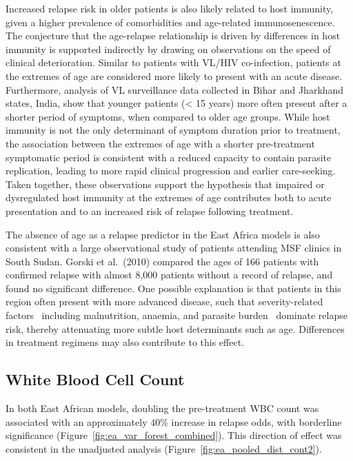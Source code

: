 Increased relapse risk in older patients is also likely related to host immunity, given a higher prevalence of comorbidities and age-related immunosenescence\cite{liu2023}. The conjecture that the age-relapse relationship is driven by differences in host immunity is supported indirectly by drawing on observations on the speed of clinical deterioration. Similar to patients with VL/HIV co-infection, patients at the extremes of age are considered more likely to present with an acute disease\cite{pareyn2025,farrar2023manson}. Furthermore, analysis of VL surveillance data collected in Bihar and Jharkhand states, India, show that younger patients (< 15 years) more often present after a shorter period of symptoms, when compared to older age groups\cite{dubey2021}. While host immunity is not the only determinant of symptom duration prior to treatment, the association between the extremes of age with a shorter pre-treatment symptomatic period is consistent with a reduced capacity to contain parasite replication, leading to more rapid clinical progression and earlier care-seeking. Taken together, these observations support the hypothesis that impaired or dysregulated host immunity at the extremes of age contributes both to acute presentation and to an increased risk of relapse following treatment.

The absence of age as a relapse predictor in the East Africa models is also consistent with a large observational study of patients attending MSF clinics in South Sudan. Gorski et al.\ (2010) compared the ages of 166 patients with confirmed relapse with almost 8,000 patients without a record of relapse, and found no significant difference\cite{gorski2010}. One possible explanation is that patients in this region often present with more advanced disease, such that severity-related factors \textemdash\ including malnutrition, anaemia, and parasite burden \textemdash\ dominate relapse risk, thereby attenuating more subtle host determinants such as age. Differences in treatment regimens may also contribute to this effect.

\subsection{White Blood Cell Count}

In both East African models, doubling the pre-treatment WBC count was associated with an approximately 40\% increase in relapse odds, with borderline significance (Figure~\ref{fig:ea_var_forest_combined}). This direction of effect was consistent in the unadjusted analysis (Figure~\ref{fig:ea_pooled_dist_cont2}).

